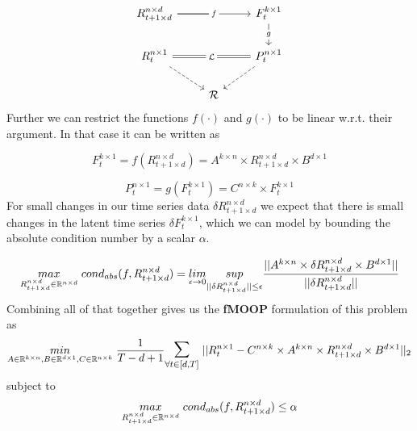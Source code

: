\begin{equation} \label{pts_diagram}
\begin{tikzcd}
R^{n\times d}_{t+1 \times d} \arrow[rr, "f" description] \arrow[r, no head]& {}& F^{k\times 1}_{t} \arrow[d, "g" description] \\
R^{n\times 1}_t \arrow[rr, "\mathcal{L}" description, Rightarrow, no head] \arrow[rd, dashed] && P^{n \times 1}_{t} \arrow[ld, dashed]\\
& \mathcal{R} &
\end{tikzcd}
\end{equation}\newline 
Further we can restrict the functions $f(\cdot)$ and $g(\cdot)$ to be linear w.r.t. their argument. In that case it can be written as

\begin{equation} \label{f_for_pts}
F^{k\times 1}_t = f(R^{n\times d}_{t+1\times d}) = A^{k\times n}\times R^{n\times d}_{t+1\times d}\times B^{d\times 1}
\end{equation}

\begin{equation} \label{g_for_pts}
P^{n \times 1}_{t} = g(F^{k\times 1}_t) = C^{n \times k} \times F^{k\times 1}_t
\end{equation}
\newline
For small changes in our time series data $\delta R^{n\times d}_{t+1\times d}$ we expect that there is small changes in the latent time series $\delta F^{k\times 1}_t$, which we can model by bounding the absolute condition number by a scalar $\alpha$.

\begin{equation}
    \underset{R^{n\times d}_{t+1\times d} \in \mathbb{R}^{n\times d}}{max}\hspace{1mm} cond_{abs}(f,R^{n\times d}_{t+1\times d}) = \underset{\epsilon \to 0}{lim}\underset{||\delta R^{n\times d}_{t+1\times d}||\le \epsilon}{sup} \frac{||A^{k\times n}\times \delta R^{n\times d}_{t+1\times d}\times B^{d\times 1}||}{||\delta R^{n\times d}_{t+1\times d}||}
\end{equation}\newline
Combining all of that together gives us the \textbf{fMOOP} formulation of this problem as
\begin{equation} \label{pts_loss}
\underset{A\in \mathbb{R}^{k\times n}, B \in \mathbb{R}^{d\times 1}, C \in \mathbb{R}^{n\times k}}{min}\hspace{1mm} \frac{1}{T-d+1} \mathlarger{\mathlarger{\sum}}_{\forall t\in [d,T]} \hspace{1mm} ||R^{n\times 1}_t-C^{n \times k} \times A^{k\times n}\times R^{n\times d}_{t+1\times d}\times B^{d\times 1}||_2
\end{equation}\newline
subject to
\begin{equation} \label{lfm_cond}
\underset{R^{n\times d}_{t+1\times d} \in \mathbb{R}^{n\times d}}{max}\hspace{1mm} cond_{abs}(f,R^{n\times d}_{t+1\times d}) \le \alpha
\end{equation}
\newline

